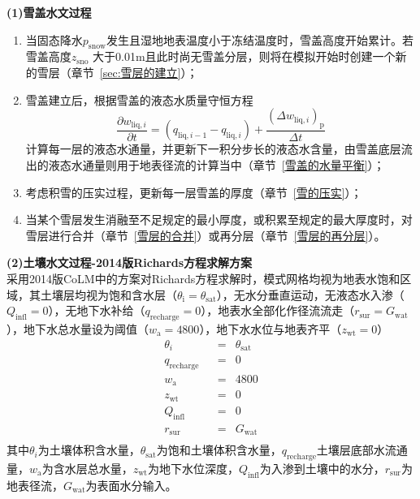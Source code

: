 \textbf {(1)雪盖水文过程}\\

\begin{enumerate}
  \item 当固态降水$p_{\mathrm {snow}} $发生且湿地地表温度小于冻结温度时，雪盖高度开始累计。若雪盖高度$z_{\mathrm{sno}}$ 大于0.01m且此时尚无雪盖分层，则将在模拟开始时创建一个新的雪层（章节~\ref{sec:雪层的建立}）；
  \item 雪盖建立后，根据雪盖的液态水质量守恒方程
    \begin{equation}
      \frac{\partial w_{\mathrm{liq},i}}{\partial t}=\left(q_{\mathrm{liq},i-1}-q_{\mathrm{liq},i}\right)+\frac{{\left(\Delta w_{\mathrm{liq},i}\right)}_{\mathrm {p}} }{\Delta t}
    \end{equation}
    计算每一层的液态水通量，并更新下一积分步长的液态水含量，由雪盖底层流出的液态水通量则用于地表径流的计算当中（章节~\ref{雪盖的水量平衡}）；
  \item 考虑积雪的压实过程，更新每一层雪盖的厚度（章节~\ref{雪的压实}）；
  \item 当某个雪层发生消融至不足规定的最小厚度，或积累至规定的最大厚度时，对雪层进行合并（章节~\ref{雪层的合并}）或再分层（章节~\ref{雪层的再分层}）。
\end{enumerate}

\textbf {(2)土壤水文过程-2014版Richards方程求解方案}\\

采用2014版CoLM中的方案对Richards方程求解时，模式网格均视为地表水饱和区域，其土壤层均视为饱和含水层（$\theta_{\mathrm{i}}=\theta_{\mathrm {sat}}$），无水分垂直运动，无液态水入渗（$Q_{\mathrm{infl}}=0$），无地下水补给（$q_{\mathrm{recharge}}=0$），地表水全部化作径流流走（$r_{\mathrm{sur}}=G_{\mathrm{wat}}$），地下水总水量设为阈值（$w_{\mathrm {a}} =4800$），地下水水位与地表齐平（$z_{\mathrm{wt}}=0$）
\begin{equation}
  \begin{aligned}
    &\theta_{i} &&= &\theta_{\mathrm {sat}}& \\
    &q_{\mathrm{recharge}} &&=&0 &\\
    &w_{\mathrm {a}}  &&=&4800& \\
    &z_{\mathrm{wt}} &&=&0& \\
    &Q_{\mathrm{infl}} &&=&0& \\
    &r_{\mathrm{sur}} &&=&G_{\mathrm{wat}}& \\
  \end{aligned}
\end{equation}
其中$\theta_{i}$为土壤体积含水量，$\theta_{\mathrm {sat}}$为饱和土壤体积含水量，$q_{\mathrm{recharge}}$土壤层底部水流通量，$w_{\mathrm{a}}$为含水层总水量，$z_{\mathrm{wt}}$为地下水位深度，$Q_{\mathrm{infl}}$为入渗到土壤中的水分，$r_{\mathrm{sur}}$为地表径流，$G_{\mathrm{wat}}$为表面水分输入。\\

